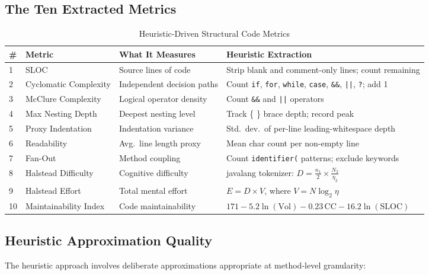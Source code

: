 \documentclass[12pt, a4paper]{report}
\begin{document}
\subsection{The Ten Extracted Metrics}

\begin{table}[h!]
\centering
\caption{Heuristic-Driven Structural Code Metrics}
\label{tab:metrics}
\begin{tabular}{C{0.4cm} L{2.8cm} L{4.2cm} L{5cm}}
\toprule
\textbf{\#} & \textbf{Metric} & \textbf{What It Measures} & \textbf{Heuristic Extraction} \\
  & SLOC & Source lines of code & Strip blank and comment-only lines; count remaining \\
2  & Cyclomatic Complexity & Independent decision paths & Count \texttt{if}, \texttt{for}, \texttt{while}, \texttt{case}, \texttt{\&\&}, \texttt{||}, \texttt{?}; add 1 \\
3  & McClure Complexity & Logical operator density & Count \texttt{\&\&} and \texttt{||} operators \\
4  & Max Nesting Depth & Deepest nesting level & Track \{ \} brace depth; record peak \\
5  & Proxy Indentation & Indentation variance & Std.\ dev.\ of per-line leading-whitespace depth \\
6  & Readability & Avg.\ line length proxy & Mean char count per non-empty line \\
7  & Fan-Out & Method coupling & Count \texttt{identifier(} patterns; exclude keywords \\
8  & Halstead Difficulty & Cognitive difficulty & javalang tokenizer: $D = \frac{n_1}{2} \times \frac{N_2}{\eta_2}$ \\
9  & Halstead Effort & Total mental effort & $E = D \times V$, where $V = N\log_2\eta$ \\
10 & Maintainability Index & Code maintainability & $171 - 5.2\ln(\text{Vol}) - 0.23\,\text{CC} - 16.2\ln(\text{SLOC})$ \\
\bottomrule
\end{tabular}
\end{table}

\subsection{Heuristic Approximation Quality}

The heuristic approach involves deliberate approximations appropriate at method-level granularity:
\end{document}
